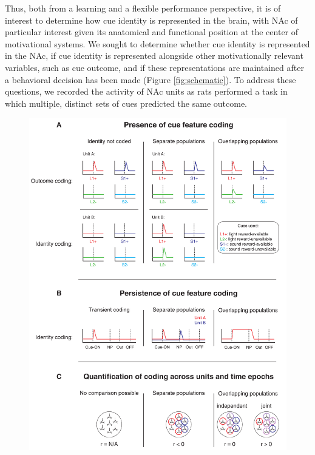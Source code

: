 \documentclass[11pt]{article}
\begin{document}
Thus, both from a learning and a flexible performance perspective, it
is of interest to determine how cue identity is represented in the
brain, with NAc of particular interest given its anatomical and
functional position at the center of motivational systems. We sought
to determine whether cue identity is represented in the NAc, if cue
identity is represented alongside other motivationally relevant
variables, such as cue outcome, and if these representations are
maintained after a behavioral decision has been made (Figure
\ref{fig:schematic}). To address these questions, we recorded the
activity of NAc units as rats performed a task in which multiple,
distinct sets of cues predicted the same outcome.


 \begin{figure}[ht!]
\centering
\includegraphics[height=0.7\textheight]{Fig 1 - Schematic neural.pdf}

\end{figure}
\end{document}
